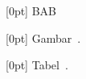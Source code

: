 \sectionfont{\normalsize}                                 %
\subsectionfont{\normalsize}
\subsubsectionfont{\normalsize}

\makeatletter
\renewcommand{\@dotsep}{1}            %
\makeatother

[0pt]                                                 %
{\bfseries}                                           %
{\MakeUppercase{Bab}\ \thecontentslabel\quad}         %
{}                                                    %
{\mdseries\dotfill\bfseries\contentspage}             %

[0pt]{}
{Gambar~\thecontentslabel.\quad}
{}
{\mdseries\dotfill\bfseries\contentspage}

[0pt]{}
{Tabel~\thecontentslabel.\quad}
{}
{\mdseries\dotfill\bfseries\contentspage}

\newcommand{\SingleSpacingEntriesOnly}[1]{%
  {%
    \begingroup #1\endgroup       %
    \begingroup
      \setstretch{1}              %
      \setlength{\parskip}{0pt}
      \normalsize
      \@starttoc{\@nameuse{ext@#1}}%
    \endgroup
  }%
}

\makeatletter
\renewcommand{\listoftables}{
  \chapter*{\listtablename}
  \addcontentsline{toc}{chapter}{\listtablename}
  \begingroup
    \setstretch{1}
    \setlength{\parskip}{0pt}
    \normalsize
    \@starttoc{lot}
  \endgroup
}

\renewcommand{\listoffigures}{
  \chapter*{\listfigurename}
  \addcontentsline{toc}{chapter}{\listfigurename}
  \begingroup
    \setstretch{1}
    \setlength{\parskip}{0pt}
    \normalsize
    \@starttoc{lof}
  \endgroup
}

\renewcommand{\tableofcontents}{
  \chapter*{\contentsname}
  \addcontentsline{toc}{chapter}{\contentsname}
  \begingroup
    \setstretch{1.5}
    \setlength{\parskip}{0pt}
    \normalsize
    \@starttoc{toc}
  \endgroup
}


